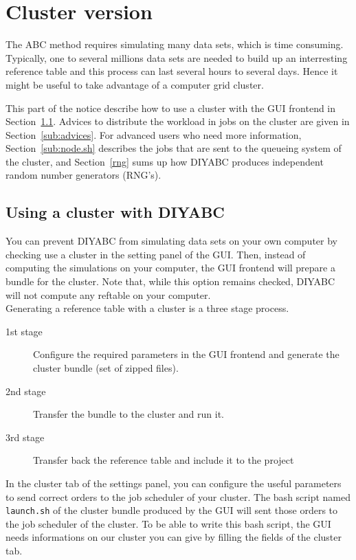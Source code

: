 \clearpage
\section{Cluster version}\label{cluster}
The ABC method requires simulating many data sets, which is time consuming. Typically, one to several millions data sets are needed to build up an interresting reference table and this process can last several hours to several days. Hence it might be useful to take advantage of a computer grid cluster.

This part of the notice describe how to use a cluster with the GUI frontend in Section~\ref{sub:proceed}. Advices to distribute the workload in jobs on the cluster are given in Section~\ref{sub:advices}. For advanced users who need more information, Section~\ref{sub:node.sh} describes the jobs that are sent to the queueing system of the cluster, and Section~\ref{rng} sums up how DIYABC produces independent random number generators (RNG's).

\subsection{Using a cluster with DIYABC}\label{sub:proceed}
You can prevent DIYABC from simulating data sets on your own computer by checking \textsf{use a cluster} in the setting panel of the GUI. Then, instead of computing the simulations on your computer, the GUI frontend will prepare a bundle for the cluster. Note that, while this option remains checked, DIYABC will not compute any reftable on your computer. 
\\
Generating a reference table with a cluster is a three stage process.
\begin{description}%
 \item[1st stage] Configure the required parameters in the GUI frontend and generate the cluster bundle (set of zipped files).
 \item[2nd stage] Transfer the bundle to the cluster and run it.
 \item[3rd stage] Transfer back the reference table and include it to the project
\end{description}

In the cluster tab of the settings panel, you can configure the useful parameters to send correct orders to the job scheduler of your cluster. The bash script named \texttt{launch.sh} of the cluster bundle produced by the GUI will sent those orders to the job scheduler of the cluster. To be able to write this bash script, the GUI needs informations on our cluster you can give by filling the fields of the cluster tab. \\

